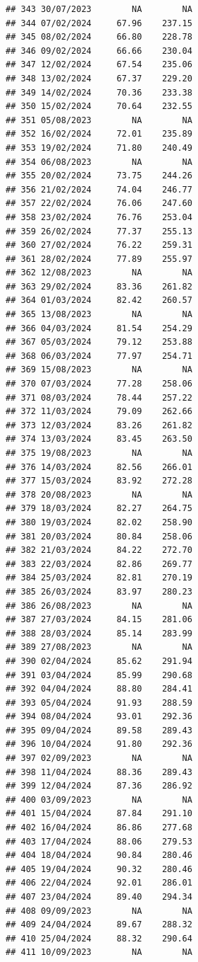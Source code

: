 \documentclass[
]{article}
\begin{document}
\begin{verbatim}
## 343 30/07/2023        NA        NA
## 344 07/02/2024     67.96    237.15
## 345 08/02/2024     66.80    228.78
## 346 09/02/2024     66.66    230.04
## 347 12/02/2024     67.54    235.06
## 348 13/02/2024     67.37    229.20
## 349 14/02/2024     70.36    233.38
## 350 15/02/2024     70.64    232.55
## 351 05/08/2023        NA        NA
## 352 16/02/2024     72.01    235.89
## 353 19/02/2024     71.80    240.49
## 354 06/08/2023        NA        NA
## 355 20/02/2024     73.75    244.26
## 356 21/02/2024     74.04    246.77
## 357 22/02/2024     76.06    247.60
## 358 23/02/2024     76.76    253.04
## 359 26/02/2024     77.37    255.13
## 360 27/02/2024     76.22    259.31
## 361 28/02/2024     77.89    255.97
## 362 12/08/2023        NA        NA
## 363 29/02/2024     83.36    261.82
## 364 01/03/2024     82.42    260.57
## 365 13/08/2023        NA        NA
## 366 04/03/2024     81.54    254.29
## 367 05/03/2024     79.12    253.88
## 368 06/03/2024     77.97    254.71
## 369 15/08/2023        NA        NA
## 370 07/03/2024     77.28    258.06
## 371 08/03/2024     78.44    257.22
## 372 11/03/2024     79.09    262.66
## 373 12/03/2024     83.26    261.82
## 374 13/03/2024     83.45    263.50
## 375 19/08/2023        NA        NA
## 376 14/03/2024     82.56    266.01
## 377 15/03/2024     83.92    272.28
## 378 20/08/2023        NA        NA
## 379 18/03/2024     82.27    264.75
## 380 19/03/2024     82.02    258.90
## 381 20/03/2024     80.84    258.06
## 382 21/03/2024     84.22    272.70
## 383 22/03/2024     82.86    269.77
## 384 25/03/2024     82.81    270.19
## 385 26/03/2024     83.97    280.23
## 386 26/08/2023        NA        NA
## 387 27/03/2024     84.15    281.06
## 388 28/03/2024     85.14    283.99
## 389 27/08/2023        NA        NA
## 390 02/04/2024     85.62    291.94
## 391 03/04/2024     85.99    290.68
## 392 04/04/2024     88.80    284.41
## 393 05/04/2024     91.93    288.59
## 394 08/04/2024     93.01    292.36
## 395 09/04/2024     89.58    289.43
## 396 10/04/2024     91.80    292.36
## 397 02/09/2023        NA        NA
## 398 11/04/2024     88.36    289.43
## 399 12/04/2024     87.36    286.92
## 400 03/09/2023        NA        NA
## 401 15/04/2024     87.84    291.10
## 402 16/04/2024     86.86    277.68
## 403 17/04/2024     88.06    279.53
## 404 18/04/2024     90.84    280.46
## 405 19/04/2024     90.32    280.46
## 406 22/04/2024     92.01    286.01
## 407 23/04/2024     89.40    294.34
## 408 09/09/2023        NA        NA
## 409 24/04/2024     89.67    288.32
## 410 25/04/2024     88.32    290.64
## 411 10/09/2023        NA        NA

\end{verbatim}
\end{document}
